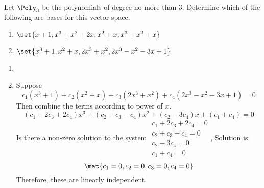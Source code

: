 \begin{ex} Let $\Poly_3$ be the polynomials of degree no more than 3. Determine which
of the following are bases for this vector space.

\begin{enumerate}
\item $\set{x+1,x^{3}+x^{2}+2x,x^{2}+x,x^{3}+x^{2}+x} $

\item $\set{x^{3}+1,x^{2}+x,2x^{3}+x^{2},2x^{3}-x^{2}-3x+1} $
\end{enumerate}

\begin{sol}
\begin{enumerate}
\item
\item
Suppose
\[
c_{1}(x^{3}+1) +c_{2}(x^{2}+x) +c_{3}(
2x^{3}+x^{2}) +c_{4}(2x^{3}-x^{2}-3x+1) =0
\]
Then combine the terms according to power of $x$.
\[
(c_{1}+2c_{3}+2c_{4}) x^{3}+(c_{2}+c_{3}-c_{4})
x^{2}+(c_{2}-3c_{4}) x+(c_{1}+c_{4}) =0
\]
Is there a non-zero solution to the system $
\begin{array}{c}
c_{1}+2c_{3}+2c_{4}=0 \\
c_{2}+c_{3}-c_{4}=0 \\
c_{2}-3c_{4}=0 \\
c_{1}+c_{4}=0
\end{array}
$, Solution is:
\[
\mat{c_{1}=0,c_{2}=0,c_{3}=0,c_{4}=0}
\]
Therefore, these are linearly independent.
\end{enumerate}
\end{sol}
\end{ex}

